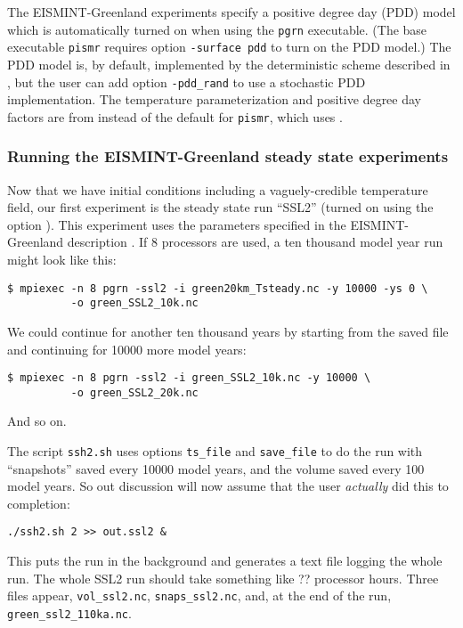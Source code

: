 The EISMINT-Greenland experiments \cite{RitzEISMINT} specify a positive degree day (PDD) model which is automatically turned on when using the \texttt{pgrn} executable.  (The base executable \texttt{pismr} requires option \texttt{-surface pdd} to turn on the PDD model.)  The PDD model is, by default, implemented by the deterministic scheme described in \cite{CalovGreve05}, but the user can add option \texttt{-pdd_rand} to use a stochastic PDD implementation.  The temperature parameterization and positive degree day factors are from \cite{RitzEISMINT} instead of the default for \texttt{pismr}, which uses \cite{Faustoetal2009}.


\subsubsection*{Running the EISMINT-Greenland steady state experiments}  Now that we have initial conditions including a vaguely-credible temperature field, our first experiment is the steady state run ``SSL2'' (turned on using the option ).  This experiment uses the parameters specified in the EISMINT-Greenland description \cite{RitzEISMINT}.  If 8 processors are used, a ten thousand model year run might look like this:

\begin{verbatim}
$ mpiexec -n 8 pgrn -ssl2 -i green20km_Tsteady.nc -y 10000 -ys 0 \
          -o green_SSL2_10k.nc
\end{verbatim}%
\noindent We could continue for another ten thousand years by starting from the saved file and continuing for 10000 more model years:
\begin{verbatim}
$ mpiexec -n 8 pgrn -ssl2 -i green_SSL2_10k.nc -y 10000 \
          -o green_SSL2_20k.nc
\end{verbatim}%
\noindent And so on.

The script \texttt{ssh2.sh} uses options \texttt{ts_file} and \texttt{save_file} to do the run with ``snapshots'' saved every 10000 model years, and the volume saved every 100 model years.  So out discussion will now assume that the user \emph{actually} did this to completion:

\begin{verbatim}
./ssh2.sh 2 >> out.ssl2 &
\end{verbatim}

\noindent This puts the run in the background and generates a text file logging the whole run.  The whole SSL2 run should take something like ?? processor hours.  Three files appear, \texttt{vol_ssl2.nc}, \texttt{snaps_ssl2.nc}, and, at the end of the run, \texttt{green_ssl2_110ka.nc}.

